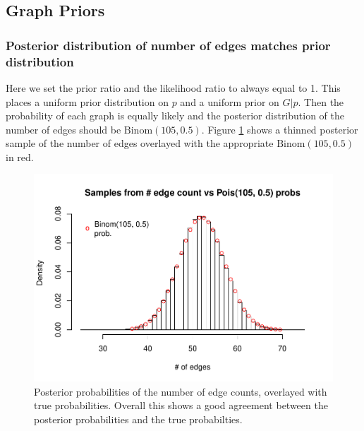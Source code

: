 \documentclass[11pt,a4paper]{article}
\numberwithin{equation}{section}
\begin{document}
\hypertarget{graph-priors}{%
\subsection{Graph Priors}\label{graph-priors}}

\hypertarget{posterior-distribution-of-number-of-edges-matches-prior-distribution}{%
\subsubsection{Posterior distribution of number of edges matches prior
distribution}\label{posterior-distribution-of-number-of-edges-matches-prior-distribution}}

Here we set the prior ratio and the likelihood ratio to always equal to
1. This places a uniform prior distribution on \(p\) and a uniform prior
on \(G|p\). Then the probability of each graph is equally likely and the
posterior distribution of the number of edges should be
\(\text{Binom}(105, 0.5)\). Figure \ref{fig:binom_hist} shows a thinned
posterior sample of the number of edges overlayed with the appropriate
\(\text{Binom}(105, 0.5)\) in red.

\begin{figure}
\centering
\includegraphics{thesis_draft_files/figure-latex/unnamed-chunk-9-1.pdf}
\caption{\label{fig:binom_hist} Posterior probabilities of the number of
edge counts, overlayed with true probabilities. Overall this shows a
good agreement between the posterior probabilities and the true
probabilties.}
\end{figure}
\end{document}
